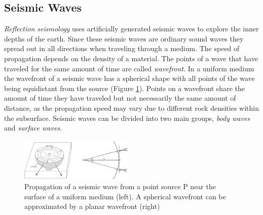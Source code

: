 \documentclass[twocolumn]{article}
\begin{document}
\subsection{Seismic Waves}
\textit{Reflection seismology} uses artificially generated seismic waves to explore the inner depths of the earth. Since these seismic waves are ordinary sound waves they spread out in all directions when traveling through a medium. The speed of propagation depends on the density of a material. The points of a wave that have traveled for the same amount of time are called \textit{wavefront}. In a uniform medium the wavefront of a seismic wave has a spherical shape with all points of the wave being equidistant from the source (Figure \ref{seismicwaves}). Points on a wavefront share the amount of time they have traveled but not necessarily the same amount of distance, as the propagation speed may vary due to different rock densities within the subsurface. Seismic waves can be divided into two main groups, \textit{body waves} and \textit{surface waves}.
\begin{figure}[htb]
        \centering
        \includegraphics[width=0.48\textwidth]{seismicwaves}
        \caption{Propagation of a seismic wave from a point source P near the surface of a uniform medium (left). A spherical wavefront can be approximated by a planar wavefront (right) }
        \label{seismicwaves}
\end{figure}
\end{document}
